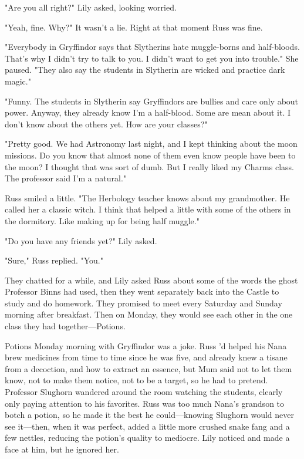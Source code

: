 "Are you all right?" Lily asked, looking worried.

"Yeah, fine. Why?" It wasn't a lie. Right at that moment Russ was fine.

"Everybody in Gryffindor says that Slytherins hate muggle-borns and half-bloods. That's why I didn't try to talk to you. I didn't want to get you into trouble." She paused. "They also say the students in Slytherin are wicked and practice dark magic."

"Funny. The students in Slytherin say Gryffindors are bullies and care only about power. Anyway, they already know I'm a half-blood. Some are mean about it. I don't know about the others yet. How are your classes?"

"Pretty good. We had Astronomy last night, and I kept thinking about the moon missions. Do you know that almost none of them even know people have been to the moon? I thought that was sort of dumb. But I really liked my Charms class. The professor said I'm a natural."

Russ smiled a little. "The Herbology teacher knows about my grandmother. He called her a classic witch. I think that helped a little with some of the others in the dormitory. Like making up for being half muggle."

"Do you have any friends yet?" Lily asked.

"Sure," Russ replied. "You."

They chatted for a while, and Lily asked Russ about some of the words the ghost Professor Binns had used, then they went separately back into the Castle to study and do homework. They promised to meet every Saturday and Sunday morning after breakfast. Then on Monday, they would see each other in the one class they had together—Potions.

Potions Monday morning with Gryffindor was a joke. Russ 'd helped his Nana brew medicines from time to time since he was five, and already knew a tisane from a decoction, and how to extract an essence, but Mum said not to let them know, not to make them notice, not to be a target, so he had to pretend. Professor Slughorn wandered around the room watching the students, clearly only paying attention to his favorites. Russ was too much Nana's grandson to botch a potion, so he made it the best he could—knowing Slughorn would never see it—then, when it was perfect, added a little more crushed snake fang and a few nettles, reducing the potion's quality to mediocre. Lily noticed and made a face at him, but he ignored her.

